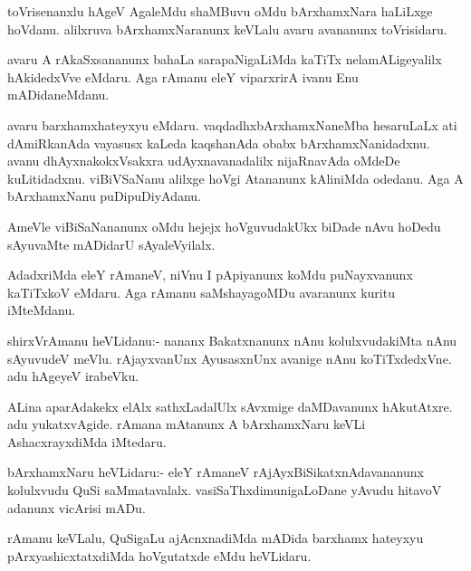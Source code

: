 \documentclass{article}
\begin{document}
\begin{mn}
toVrisenanxlu  hAgeV  AgaleMdu  shaMBuvu  oMdu  bArxhamxNara  haLiLxge  hoVdanu.  alilxruva  bArxhamxNaranunx  keVLalu  
avaru  avananunx  toVrisidaru.
\end{mn}

\begin{mn}
avaru  A  rAkaSxsananunx  bahaLa  sarapaNigaLiMda  kaTiTx  nelamALigeyalilx  hAkidedxVve  eMdaru.  Aga  rAmanu  eleY  
viparxrirA  ivanu  Enu  mADidaneMdanu.
\end{mn}

\begin{mn}
avaru  barxhamxhateyxyu  eMdaru.  vaqdadhxbArxhamxNaneMba  hesaruLaLx  ati  dAmiRkanAda  vayasusx  kaLeda  kaqshanAda  
obabx  bArxhamxNanidadxnu.  avanu  dhAyxnakokxVsakxra  udAyxnavanadalilx  nijaRnavAda  oMdeDe  kuLitidadxnu.  viBiVSaNanu  
alilxge  hoVgi  Atananunx  kAliniMda  odedanu.  Aga  A  bArxhamxNanu  puDipuDiyAdanu.
\end{mn}

\begin{mn}
AmeVle  viBiSaNananunx  oMdu  hejejx  hoVguvudakUkx  biDade  nAvu  hoDedu  sAyuvaMte  mADidarU  sAyaleVyilalx.  
\end{mn}

\begin{mn}
AdadxriMda  eleY  rAmaneV,  niVnu  I  pApiyanunx  koMdu  puNayxvanunx  kaTiTxkoV  eMdaru.  Aga  rAmanu  
saMshayagoMDu  avaranunx  kuritu  iMteMdanu.
\end{mn}

\begin{mn}
shirxVrAmanu  heVLidanu:-  nananx  Bakatxnanunx  nAnu  kolulxvudakiMta  nAnu  sAyuvudeV  meVlu.  rAjayxvanUnx  
AyusasxnUnx  avanige  nAnu  koTiTxdedxVne.  adu  hAgeyeV  irabeVku.
\end{mn}

\begin{mn}
ALina  aparAdakekx  elAlx  sathxLadalUlx  sAvxmige  daMDavanunx  hAkutAtxre.  adu  yukatxvAgide.  rAmana  
mAtanunx  A  bArxhamxNaru  keVLi  AshacxrayxdiMda  iMtedaru.
\end{mn}

\begin{mn}
bArxhamxNaru  heVLidaru:- eleY  rAmaneV  rAjAyxBiSikatxnAdavananunx  kolulxvudu  QuSi  saMmatavalalx.  
vasiSaThxdimunigaLoDane  yAvudu  hitavoV  adanunx  vicArisi  mADu.
\end{mn}

\begin{mn}
rAmanu  keVLalu,  QuSigaLu  ajAcnxnadiMda  mADida  barxhamx  hateyxyu  pArxyashicxtatxdiMda  hoVgutatxde  eMdu  heVLidaru.
\end{mn}
\end{document}
